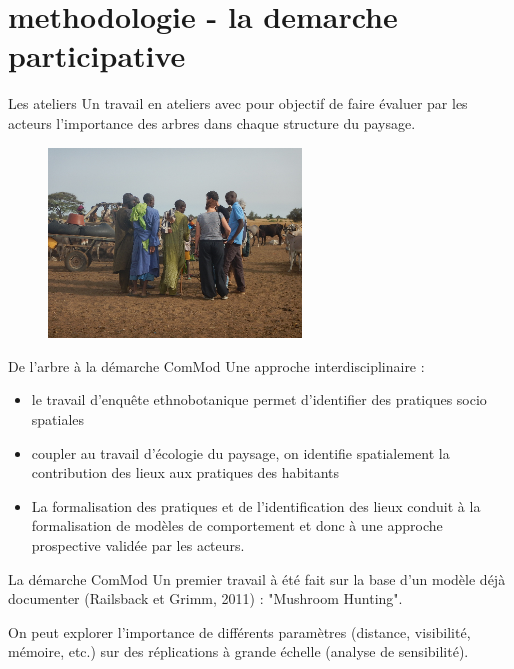 \documentclass[newPxFont]{beamer}
\begin{document}
\section{methodologie - la demarche participative}
\begin{frame}[c]{Les ateliers}
\vspace{-1cm}
Un travail en ateliers avec pour objectif de faire évaluer par les acteurs l'importance des arbres dans chaque structure du paysage.
\begin{figure}
	\centering
	\includegraphics[width = 0.6\textwidth]{img/group1.png}
\end{figure}
\end{frame}


\begin{frame}[c]{De l'arbre à la démarche ComMod}
\vspace{-1cm}
Une approche interdisciplinaire :
\begin{itemize}
  \item le travail d'enquête ethnobotanique permet d'identifier des pratiques socio spatiales
  \item coupler au travail d'écologie du paysage, on identifie spatialement la contribution des lieux aux pratiques des habitants
  \item La formalisation des pratiques et de l'identification des lieux conduit à la formalisation de modèles de comportement et donc à une approche prospective validée par les acteurs.
\end{itemize}
\end{frame}

\begin{frame}[c]{La démarche ComMod}
\vspace{-1cm}
Un premier travail à été fait sur la base d'un modèle déjà documenter (Railsback et Grimm, 2011) : "Mushroom Hunting".

\begin{center}
\end{center}

On peut explorer l'importance de différents paramètres (distance, visibilité, mémoire, etc.) sur des réplications à grande échelle (analyse de sensibilité).
\end{frame}
\end{document}
